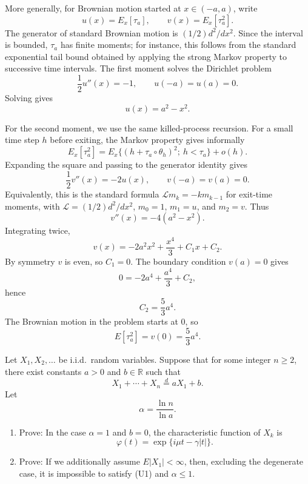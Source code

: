 \begin{solution}
More generally, for Brownian motion started at $x\in(-a,a)$, write
\[
u(x)=E_x[\tau_a],\qquad v(x)=E_x[\tau_a^2].
\]
The generator of standard Brownian motion is $(1/2)d^2/dx^2$. Since the interval is bounded, $\tau_a$ has finite moments; for instance, this follows from the standard exponential tail bound obtained by applying the strong Markov property to successive time intervals. The first moment solves the Dirichlet problem
\[
\frac{1}{2}u''(x)=-1,\qquad u(-a)=u(a)=0.
\]
Solving gives
\[
u(x)=a^2-x^2.
\]

For the second moment, we use the same killed-process recursion. For a small time step $h$ before exiting, the Markov property gives informally
\[
E_x[\tau_a^2]
=E_x\{(h+\tau_a\circ\theta_h)^2;\ h<\tau_a\}+o(h).
\]
Expanding the square and passing to the generator identity gives
\[
\frac{1}{2}v''(x)=-2u(x),
\qquad v(-a)=v(a)=0.
\]
Equivalently, this is the standard formula $\mathcal{L}m_k=-k m_{k-1}$ for exit-time moments, with $\mathcal{L}=(1/2)d^2/dx^2$, $m_0=1$, $m_1=u$, and $m_2=v$.
Thus
\[
v''(x)=-4(a^2-x^2).
\]
Integrating twice,
\[
v(x)=-2a^2x^2+\frac{x^4}{3}+C_1x+C_2.
\]
By symmetry $v$ is even, so $C_1=0$. The boundary condition $v(a)=0$ gives
\[
0=-2a^4+\frac{a^4}{3}+C_2,
\]
hence
\[
C_2=\frac{5}{3}a^4.
\]
The Brownian motion in the problem starts at $0$, so
\[
\boxed{E[\tau_a^2]=v(0)=\frac{5}{3}a^4.}
\]
\end{solution}

\begin{exercise}\label{probability:2026:5}
Let $X_1,X_2,\ldots$ be i.i.d.\ random variables. Suppose that for some integer $n\geq 2$, there exist constants $a>0$ and $b\in\mathbb{R}$ such that
\[
X_1+\cdots+X_n\stackrel{d}{=}aX_1+b. \tag{U1}
\]
Let
\[
\alpha=\frac{\ln n}{\ln a}.
\]
\begin{enumerate}
    \item[(a)] Prove: In the case $\alpha=1$ and $b=0$, the characteristic function of $X_k$ is
    \[
    \varphi(t)=\exp\{i\mu t-\gamma |t|\}.
    \]

    \item[(b)] Prove: If we additionally assume $E|X_1|<\infty$, then, excluding the degenerate case, it is impossible to satisfy (U1) and $\alpha\leq 1$.
\end{enumerate}
\end{exercise}

